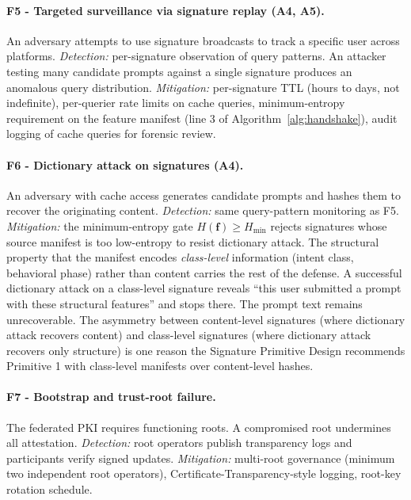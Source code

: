 \documentclass[11pt]{article}
\begin{document}
\paragraph{F5 - Targeted surveillance via signature replay (A4, A5).}
An adversary attempts to use signature broadcasts to track a specific user across platforms. \emph{Detection:} per-signature observation of query patterns. An attacker testing many candidate prompts against a single signature produces an anomalous query distribution. \emph{Mitigation:} per-signature TTL (hours to days, not indefinite), per-querier rate limits on cache queries, minimum-entropy requirement on the feature manifest (line 3 of Algorithm~\ref{alg:handshake}), audit logging of cache queries for forensic review.

\paragraph{F6 - Dictionary attack on signatures (A4).}
An adversary with cache access generates candidate prompts and hashes them to recover the originating content. \emph{Detection:} same query-pattern monitoring as F5. \emph{Mitigation:} the minimum-entropy gate $H(\mathbf{f}) \geq H_{\min}$ rejects signatures whose source manifest is too low-entropy to resist dictionary attack. The structural property that the manifest encodes \emph{class-level} information (intent class, behavioral phase) rather than content carries the rest of the defense. A successful dictionary attack on a class-level signature reveals ``this user submitted a prompt with these structural features'' and stops there. The prompt text remains unrecoverable. The asymmetry between content-level signatures (where dictionary attack recovers content) and class-level signatures (where dictionary attack recovers only structure) is one reason the Signature Primitive Design recommends Primitive 1 with class-level manifests over content-level hashes.

\paragraph{F7 - Bootstrap and trust-root failure.}
The federated PKI requires functioning roots. A compromised root undermines all attestation. \emph{Detection:} root operators publish transparency logs and participants verify signed updates. \emph{Mitigation:} multi-root governance (minimum two independent root operators), Certificate-Transparency-style logging, root-key rotation schedule.
\end{document}
